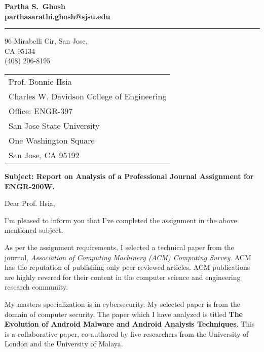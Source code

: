 \documentclass{article} %
\begin{document}
\begin{flushleft} 
    \large\bfseries Partha S.\ Ghosh \\
    \small parthasarathi.ghosh@sjsu.edu
\end{flushleft}
\medskip\hrule height 1pt
\begin{flushright}
  96 Mirabelli Cir, San Jose, \\ 
  CA 95134 \\
  (408) 206-8195
\end{flushright}

\bigskip


\bigskip

\noindent
\begin{tabular}{@{}l}
 	Prof. Bonnie Hsia \\
    Charles W. Davidson College of Engineering \\
	Office: ENGR-397 \\
    San Jose State University \\
    One Washington Square \\
    San Jose, CA 95192
\end{tabular}

\bigskip
\textbf{Subject: Report on Analysis of a Professional Journal Assignment for ENGR-200W.\\}

\noindent Dear Prof. Hsia,

\setlength{\parskip}{\baselineskip}

\noindent I'm pleased to inform you that I've completed the assignment in the above mentioned subject.

\noindent As per the assignment requirements, I selected a technical paper from the journal, \textit {Association of Computing Machinery (ACM) Computing Survey}. ACM has the reputation of publishing only peer reviewed articles. ACM publications are highly revered for their content in the computer science and engineering research community.

\noindent My masters specialization is in cybersecurity. My selected paper is from the domain of computer security. The paper which I have analyzed is titled  \textbf{The Evolution of Android Malware and Android Analysis Techniques}. This is a collaborative paper, co-authored by five researchers from the University of London and the University of Malaya.
\end{document}
